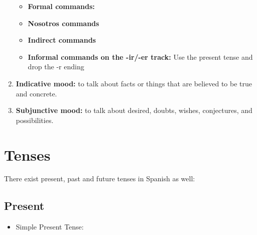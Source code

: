 \documentclass[a4paper,12pt]{article}
\begin{document}
\begin{enumerate}
\begin{itemize}
  \item \textbf{Formal commands:}


  \item \textbf{Nosotros commands}
  \item \textbf{Indirect commands}


\item \textbf{Informal commands on the -ir/-er track:} Use the present tense and drop the -r ending


  \end{itemize}


\item \textbf{Indicative mood:} to talk about facts or things that are believed to be true and
  concrete.
\item \textbf{Subjunctive mood:} to talk about desired, doubts, wishes, conjectures, and
  possibilities.

\end{enumerate}


\section{Tenses}

There exist present, past and future tenses in Spanish as well:


\subsection{Present}

\begin{itemize}
\item Simple Present Tense:

\end{itemize}


\appendix

\printindex[Verbs] %

\printindex[Nouns]

\printindex[Pronouns]
\end{document}
